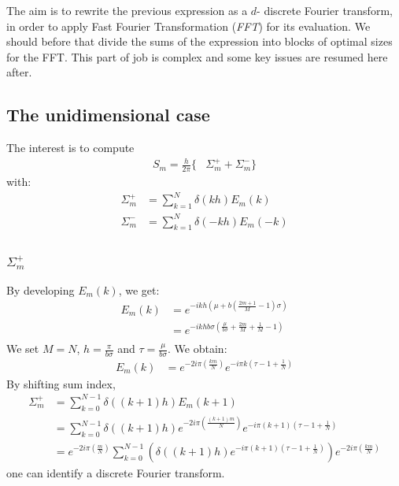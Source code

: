 The aim is to rewrite the previous expression as a $d$- discrete Fourier transform, in order to apply Fast Fourier Transformation (\emph{FFT}) for its evaluation.
We should before that divide the sums of the expression into blocks of optimal sizes for the FFT. This part of job is complex and some key issues are resumed here after.

\subsection{The unidimensional case}

The interest is to compute
\begin{align}
S_{m}=\frac{h}{2\pi}\Big\{&\Sigma_{m}^{+} + \Sigma_{m}^{-} \Big\}
\end{align}
with:
\begin{align}
\Sigma_{m}^{+}&=\sum_{k=1}^{N}\delta( kh)E_{m}(k)\\
\Sigma_{m}^{-}&=\sum_{k=1}^{N}\delta(-kh)E_{m}(-k)\\
\end{align}

\subsubsection{$\Sigma_{m}^{+}$}
By developing $E_m(k)$, we get:
\begin{align*}
E_{m}(k)&=e^{-ikh\left(\mu+b\left(\frac{2m+1}{M}-1\right)\sigma\right)}\\
&=e^{-ikhb\sigma\left(\frac{\mu}{b\sigma}+\frac{2m}{M}+\frac{1}{M}-1\right)}\\
\end{align*}
We set $M=N$, $h=\frac{\pi}{b\sigma}$ and $\tau=\frac{\mu}{b\sigma}$. We obtain:
\begin{align*}
E_{m}(k)&=e^{-2i\pi\left(\frac{k m}{N}\right)}e^{-i\pi k\left(\tau-1+\frac{1}{N}\right)}
\end{align*}
By shifting sum index,
\begin{align*}
\Sigma_{m}^{+}&=\sum_{k=0}^{N-1}\delta((k+1)h)E_{m}(k+1)\\
  &=\sum_{k=0}^{N-1}\delta((k+1)h) e^{-2i\pi\left(\frac{(k+1) m}{N}\right)} e^{-i\pi (k+1)\left(\tau-1+\frac{1}{N}\right)}\\
  &=e^{-2i\pi\left(\frac{m}{N}\right)} \sum_{k=0}^{N-1}\left(\delta((k+1)h) e^{-i\pi (k+1)\left(\tau-1+\frac{1}{N}\right)}\right) e^{-2i\pi\left(\frac{k m}{N}\right)} 
\end{align*}
one can identify a discrete Fourier transform.

